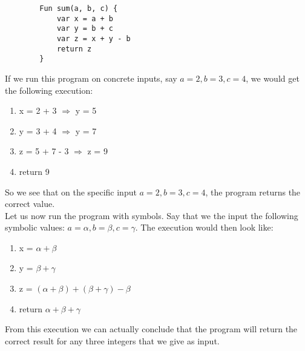	\begin{verbatim}
		Fun sum(a, b, c) {
			var x = a + b
			var y = b + c
			var z = x + y - b
			return z
		}
	\end{verbatim} 
	
	If we run this program on concrete inputs, say $a = 2, b = 3, c = 4$, we would get the following execution:
	
	\begin{enumerate} 
		\item x = 2 + 3 $\Rightarrow$ y = 5
		\item y = 3 + 4 $\Rightarrow$ y = 7
		\item z = 5 + 7 - 3 $\Rightarrow$ z = 9
		\item return 9
	\end{enumerate}
	
	So we see that on the specific input $a = 2, b = 3, c = 4$, the program returns the correct value.
	\\
	Let us now run the program with symbols. Say that we the input the following symbolic values: $a = \alpha, b = \beta, c = \gamma$.
	The execution would then look like:
	
	\begin{enumerate}
		\item x = $\alpha + \beta$
		\item y = $\beta  + \gamma$
		\item z = $(\alpha + \beta) + (\beta + \gamma) - \beta$
		\item return $\alpha + \beta + \gamma$
	\end{enumerate}
	
	From this execution we can actually conclude that the program will return the correct result for any three integers that we give as input. 